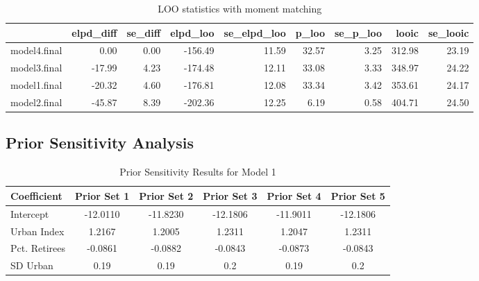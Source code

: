 \documentclass[12pt]{article}
\begin{document}
%
%
%



\begin{table}[ht!]
	\centering
	\caption{LOO statistics with moment matching}
	\begin{tabular}{rrrrrrrrr}
		\hline
		& elpd\_diff & se\_diff & elpd\_loo & se\_elpd\_loo & p\_loo & se\_p\_loo & looic & se\_looic \\ 
		\hline
		model4.final & 0.00 & 0.00 & -156.49 & 11.59 & 32.57 & 3.25 & 312.98 & 23.19 \\ 
		model3.final & -17.99 & 4.23 & -174.48 & 12.11 & 33.08 & 3.33 & 348.97 & 24.22 \\ 
		model1.final & -20.32 & 4.60 & -176.81 & 12.08 & 33.34 & 3.42 & 353.61 & 24.17 \\ 
		model2.final & -45.87 & 8.39 & -202.36 & 12.25 & 6.19 & 0.58 & 404.71 & 24.50 \\ 
		\hline
	\end{tabular}

\end{table}






\FloatBarrier
\subsection*{Prior Sensitivity Analysis}
\begin{table}[h]
    \centering
    \caption{Prior Sensitivity Results for Model 1}
    \label{tab:Prior Sensitivity Results for Model 1}
    \begin{tabular}{l|ccccc}
        \hline
        Coefficient    & Prior Set 1 & Prior Set 2 & Prior Set 3 & Prior Set 4 & Prior Set 5 \\
        \hline
        Intercept      & -12.0110 & -11.8230 & -12.1806 & -11.9011 & -12.1806 \\
        Urban Index    & 1.2167 & 1.2005 & 1.2311 & 1.2047 & 1.2311 \\
        Pct. Retirees  & -0.0861 & -0.0882 & -0.0843 & -0.0873 & -0.0843 \\
        SD Urban       & 0.19    & 0.19    & 0.2     & 0.19    & 0.2     \\
        \hline
        \hline
    \end{tabular}

\end{table}
\end{document}
